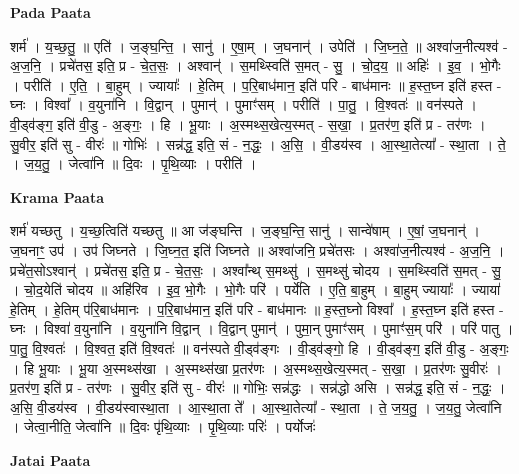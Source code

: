 \documentclass[17pt]{extarticle}
\begin{document}
\textbf{Pada Paata} \newline

शर्म॑ । य॒च्छ॒तु॒ ॥ एति॑ । ज॒ङ्घ॒न्ति॒ । सानु॑ । ए॒षा॒म् । ज॒घनान्॑ । उपेति॑ । जि॒घ्न॒ते॒ ॥ अश्वा॑ज॒नीत्यश्व॑ - अ॒ज॒नि॒ । प्रचे॑तस॒ इति॒ प्र - चे॒त॒सः॒ । अश्वान्॑ । स॒मथ्स्विति॑ स॒मत् - सु॒ । चो॒द॒य॒ ॥ अहिः॑ । इ॒व॒ । भो॒गैः । परीति॑ । ए॒ति॒ । बा॒हुम् । ज्यायाः᳚ । हे॒तिम् । प॒रि॒बाध॑मान॒ इति॑ परि - बाध॑मानः ॥ ह॒स्त॒घ्न इति॑ हस्त - घ्नः । विश्वा᳚ । व॒युना॑नि । वि॒द्वान् । पुमान्॑ । पुमाꣳ॑सम् । परीति॑ । पा॒तु॒ । वि॒श्वतः॑ ॥ वन॑स्पते । वी॒ड्व॑ङ्ग॒ इति॑ वी॒डु - अ॒ङ्गः॒ । हि । भू॒याः । अ॒स्मथ्स॒खेत्य॒स्मत् - स॒खा॒ । प्र॒तर॑ण॒ इति॑ प्र - तर॑णः । सु॒वीर॒ इति॑ सु - वीरः॑ ॥ गोभिः॑ । सन्न॑द्ध॒ इति॒ सं - न॒द्धः॒ । अ॒सि॒ । वी॒डय॑स्व । आ॒स्था॒तेत्या᳚ - स्था॒ता । ते॒ । ज॒य॒तु॒ । जेत्वा॑नि ॥ दि॒वः । पृ॒थि॒व्याः । परीति॑ ।  \newline


\textbf{Krama Paata} \newline

शर्म॑ यच्छतु । य॒च्छ॒त्विति॑ यच्छतु ॥ आ ज॑ङ्घन्ति । ज॒ङ्घ॒न्ति॒ सानु॑ । सान्वे॑षाम् । ए॒षां॒ ज॒घनान्॑ । ज॒घनाꣳ॒॒ उप॑ । उप॑ जिघ्नते । जि॒घ्न॒त॒ इति॑ जिघ्नते ॥ अश्वा॑जनि॒ प्रचे॑तसः । अश्वा॑ज॒नीत्यश्व॑ - अ॒ज॒नि॒ । प्रचे॑त॒सोऽश्वान्॑ । प्रचे॑तस॒ इति॒ प्र - चे॒त॒सः॒ । अश्वा᳚न्थ् स॒मथ्सु॑ । स॒मथ्सु॑ चोदय । स॒मथ्स्विति॑ स॒मत् - सु॒ । चो॒द॒येति॑ चोदय ॥ अहि॑रिव । इ॒व॒ भो॒गैः । भो॒गैः परि॑ । पर्ये॑ति । ए॒ति॒ बा॒हुम् । बा॒हुम् ज्यायाः᳚ । ज्याया॑ हे॒तिम् । हे॒तिम् प॑रि॒बाध॑मानः । प॒रि॒बाध॑मान॒ इति॑ परि - बाध॑मानः ॥ ह॒स्त॒घ्नो विश्वा᳚ । ह॒स्त॒घ्न इति॑ हस्त - घ्नः । विश्वा॑ व॒युना॑नि । व॒युना॑नि वि॒द्वान् । वि॒द्वान् पुमान्॑ । पुमा॒न् पुमाꣳ॑सम् । पुमाꣳ॑स॒म् परि॑ । परि॑ पातु । पा॒तु॒ वि॒श्वतः॑ । वि॒श्वत॒ इति॑ वि॒श्वतः॑ ॥ वन॑स्पते वी॒ड्व॑ङ्गः । वी॒ड्व॑ङ्गो॒ हि । वी॒ड्व॑ङ्ग॒ इति॑ वी॒डु - अ॒ङ्गः॒ । हि भू॒याः । भू॒या अ॒स्मथ्स॑खा । अ॒स्मथ्स॑खा प्र॒तर॑णः । अ॒स्मथ्स॒खेत्य॒स्मत् - स॒खा॒ । प्र॒तर॑णः सु॒वीरः॑ । प्र॒तर॑ण॒ इति॑ प्र - तर॑णः । सु॒वीर॒ इति॑ सु - वीरः॑ ॥ गोभिः॒ सन्न॑द्धः । सन्न॑द्धो असि । सन्न॑द्ध॒ इति॒ सं - न॒द्धः॒ । अ॒सि॒ वी॒डय॑स्व । वी॒डय॑स्वास्था॒ता । आ॒स्था॒ता ते᳚ । आ॒स्था॒तेत्या᳚ - स्था॒ता । ते॒ ज॒य॒तु॒ । ज॒य॒तु॒ जेत्वा॑नि । जेत्वा॒नीति॒ जेत्वा॑नि ॥ दि॒वः पृ॑थि॒व्याः । पृ॒थि॒व्याः परिः॑ । पर्योजः॑ \newline

\textbf{Jatai Paata} \newline
\end{document}
